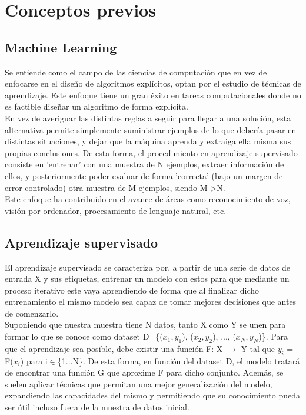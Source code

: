 \chapter{Conceptos previos}


\section{Machine Learning}

Se entiende como el campo de las ciencias de computación que en vez de enfocarse en el diseño de algoritmos explícitos, optan por el estudio de técnicas de aprendizaje. Este enfoque tiene un gran éxito en tareas computacionales donde no es factible diseñar un algoritmo de forma explícita. \cite{Programming_Massively} \\
En vez de averiguar las distintas reglas a seguir para llegar a una solución, esta alternativa permite simplemente suministrar ejemplos de lo que debería pasar en distintas situaciones, y dejar que la máquina aprenda y extraiga ella misma sus propias conclusiones. De esta forma, el procedimiento en aprendizaje supervisado consiste en 'entrenar' con una muestra de N ejemplos, extraer información de ellos, y posteriormente poder evaluar de forma 'correcta' (bajo un margen de error controlado) otra muestra de M ejemplos, siendo M \textgreater N. \cite{Learning_From_Data} \\
Este enfoque ha contribuido en el avance de áreas como reconocimiento de voz, visión por ordenador, procesamiento de lenguaje natural, etc.

\section{Aprendizaje supervisado}

El aprendizaje supervisado se caracteriza por, a partir de una serie de datos de entrada X y sus etiquetas, entrenar un modelo con estos para que mediante un proceso iterativo este vaya aprendiendo de forma que al finalizar dicho entrenamiento el mismo modelo sea capaz de tomar mejores decisiones que antes de comenzarlo. \\
Suponiendo que nuestra muestra tiene N datos, tanto X como Y se unen para formar lo que se conoce como dataset D=\{($x_1, y_1$), ($x_2, y_2$), ..., ($x_N, y_N$)\}. Para que el aprendizaje sea posible, debe existir una función F: X $\rightarrow$ Y tal que $y_i$ = F($x_i$) para i$\in$\{1...N\}. De esta forma, en función del dataset D, el modelo tratará de encontrar una función G que aproxime F para dicho conjunto. Además, se suelen aplicar técnicas que permitan una mejor generalización del modelo, expandiendo las capacidades del mismo y permitiendo que su conocimiento pueda ser útil incluso fuera de la muestra de datos inicial. \cite{Learning_From_Data}

